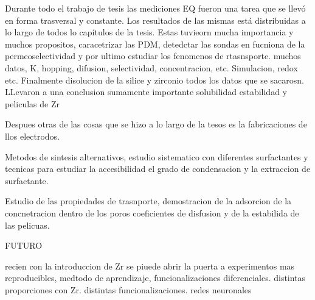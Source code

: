 Durante todo el trabajo de tesis las mediciones EQ fueron una tarea que se llevó en forma trasversal y constante. Los resultados de las mismas está distribuidas a lo largo de todos lo capítulos de la tesis.  Estas tuvieorn mucha importancia y muchos propositos, caracetrizar las PDM, detedctar las sondas en fucniona de la permeoselectividad y por ultimo estudiar los fenomenos de rtasnsporte.
muchos datos, K, hopping, difusion, selectividad, concentracion, etc. Simulacion, redox etc. Finalmente disolucion de la silice y zirconio
todos los datos que se sacarosn. LLevaron a una conclusion sumamente importante solubilidad estabilidad y peliculas de Zr

Despues otras de las cosas que se hizo a lo largo de la tesos es la fabricaciones de llos electrodos.


Metodos de sintesis alternativos, estudio sistematico con diferentes surfactantes y tecnicas para estudiar la accesibilidad el grado de condensacion y la extraccion de surfactante.

Estudio de las propiedades de trasnporte, demostracion de la adsorcion de la concnetracion dentro de los poros coeficientes de disfusion y de la estabilida de las pelicuas.



FUTURO

recien con la introduccion de Zr se piuede abrir la puerta a experimentos mas reproducibles, medtodo de aprendizaje, funcionalizaciones diferenciales. distintas proporciones con Zr. distintas funcionalizaciones.
redes neuronales

\newpage

